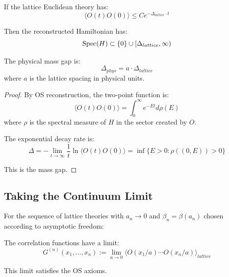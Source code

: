 \begin{theorem}
\label{thm:spectral-implies-mass}
If the lattice Euclidean theory has:
\[
\langle O(t) O(0) \rangle \leq C e^{-\Delta_{lattice} \cdot t}
\]

Then the reconstructed Hamiltonian has:
\[
\operatorname{Spec}(H) \subset \{0\} \cup [\Delta_{lattice}, \infty)
\]

The physical mass gap is:
\[
\Delta_{phys} = a \cdot \Delta_{lattice}
\]
where $a$ is the lattice spacing in physical units.
\end{theorem}

\begin{proof}
By OS reconstruction, the two-point function is:
\[
\langle O(t) O(0) \rangle = \int_0^\infty e^{-Et} d\rho(E)
\]
where $\rho$ is the spectral measure of $H$ in the sector created by $O$.

The exponential decay rate is:
\[
\Delta = -\lim_{t \to \infty} \frac{1}{t} \ln \langle O(t) O(0) \rangle = \inf\{E > 0 : \rho((0,E)) > 0\}
\]

This is the mass gap.
\end{proof}

\subsection{Taking the Continuum Limit}

\begin{theorem}
\label{thm:continuum-existence}
For the sequence of lattice theories with $a_n \to 0$ and $\beta_n = \beta(a_n)$ 
chosen according to asymptotic freedom:

The correlation functions have a limit:
\[
G^{(n)}(x_1, \ldots, x_n) := \lim_{a \to 0} \langle O(x_1/a) \cdots O(x_n/a) \rangle_{lattice}
\]

This limit satisfies the OS axioms.
\end{theorem}

